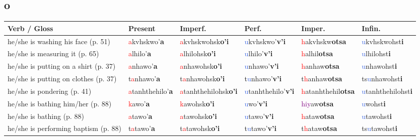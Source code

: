 \documentclass[oneside,openany]{book}%
\begin{document}
\subsection*{o}%
\begin{tabularx}{\textwidth}{>{\hsize=1.5\hsize\RaggedRight}X >{\hsize=0.9\hsize}X >{\hsize=0.9\hsize}X >{\hsize=0.9\hsize}X >{\hsize=0.9\hsize}X >{\hsize=0.9\hsize}X}%
\toprule%
\textbf{Verb / Gloss}&\textbf{Present}&\textbf{Imperf.}&\textbf{Perf.}&\textbf{Imper.}&\textbf{Infin.}\\%
\midrule%
he/she is washing his face (p. 51)&\textcolor{Red}{a}kvhskwo'\textbf{a}&\textcolor{Red}{a}kvhskwohsk\textbf{o'i}&\textcolor{RoyalBlue}{u}kvhskwo'\textbf{v'i}&\textcolor{Red}{h}akvhskw\textbf{otsa}&\textcolor{RoyalBlue}{u}kvhskwohst\textbf{i}\\%
he/she is measuring it (p. 65)&\textcolor{Red}{a}lhilo'\textbf{a}&\textcolor{Red}{a}lhilohsk\textbf{o'i}&\textcolor{RoyalBlue}{u}lhilo'\textbf{v'i}&\textcolor{Red}{h}alhil\textbf{otsa}&\textcolor{RoyalBlue}{u}lhilohst\textbf{i}\\%
he/she is putting on a shirt (p. 37)&\textcolor{Red}{a}nhawo'\textbf{a}&\textcolor{Red}{a}nhawohsk\textbf{o'i}&\textcolor{RoyalBlue}{u}nhawo'\textbf{v'i}&\textcolor{Red}{h}anhaw\textbf{otsa}&\textcolor{RoyalBlue}{u}nhawohst\textbf{i}\\%
he/she is putting on clothes (p. 37)&t\textcolor{Red}{a}nhawo'\textbf{a}&t\textcolor{Red}{a}nhawohsk\textbf{o'i}&t\textcolor{RoyalBlue}{u}nhawo'\textbf{v'i}&t\textcolor{Red}{h}anhaw\textbf{otsa}&ts\textcolor{RoyalBlue}{u}nhawohst\textbf{i}\\%
he/she is pondering (p. 41)&\textcolor{Red}{a}tanhthehilo'\textbf{a}&\textcolor{Red}{a}tanhthehilohsk\textbf{o'i}&\textcolor{RoyalBlue}{u}tanhthehilo'\textbf{v'i}&\textcolor{Red}{h}atanhthehil\textbf{otsa}&\textcolor{RoyalBlue}{u}tanhthehilohst\textbf{i}\\%
he/she is bathing him/her (p. 88)&\textcolor{Red}{k}awo'\textbf{a}&\textcolor{Red}{k}awohsk\textbf{o'i}&\textcolor{RoyalBlue}{u}wo'\textbf{v'i}&\textcolor{Purple}{hiy}aw\textbf{otsa}&\textcolor{RoyalBlue}{u}wohst\textbf{i}\\%
he/she is bathing (p. 88)&\textcolor{Red}{a}tawo'\textbf{a}&\textcolor{Red}{a}tawohsk\textbf{o'i}&\textcolor{RoyalBlue}{u}tawo'\textbf{v'i}&\textcolor{Red}{h}ataw\textbf{otsa}&\textcolor{RoyalBlue}{u}tawohst\textbf{i}\\%
he/she is performing baptism (p. 88)&t\textcolor{Red}{a}tawo'\textbf{a}&t\textcolor{Red}{a}tawohsk\textbf{o'i}&t\textcolor{RoyalBlue}{u}tawo'\textbf{v'i}&t\textcolor{Red}{h}ataw\textbf{otsa}&ts\textcolor{RoyalBlue}{u}tawohst\textbf{i}\\%

\end{tabularx}
\end{document}
